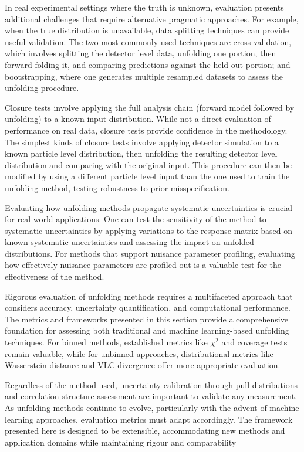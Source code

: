         In real experimental settings where the truth is unknown, evaluation presents additional challenges that require alternative pragmatic approaches.
        For example, when the true distribution is unavailable, data splitting techniques can provide useful validation.
        The two most commonly used techniques are cross validation, which involves splitting the detector level data, unfolding one portion, then forward folding it, and comparing predictions against the held out portion; and bootstrapping, where one generates multiple resampled datasets to assess the unfolding procedure.

        Closure tests involve applying the full analysis chain (forward model followed by unfolding) to a known input distribution.
        While not a direct evaluation of performance on real data, closure tests provide confidence in the methodology.
        The simplest kinds of closure tests involve applying detector simulation to a known particle level distribution, then unfolding the resulting detector level distribution and comparing with the original input.
        This procedure can then be modified by using a different particle level input than the one used to train the unfolding method, testing robustness to prior misspecification.
        
        Evaluating how unfolding methods propagate systematic uncertainties is crucial for real world applications.
        One can test the sensitivity of the method to systematic uncertainties by applying variations to the response matrix based on known systematic uncertainties and assessing the impact on unfolded distributions.
        For methods that support nuisance parameter profiling, evaluating how effectively nuisance parameters are profiled out is a valuable test for the effectiveness of the method.

        Rigorous evaluation of unfolding methods requires a multifaceted approach that considers accuracy, uncertainty quantification, and computational performance.
        The metrics and frameworks presented in this section provide a comprehensive foundation for assessing both traditional and machine learning-based unfolding techniques.
        For binned methods, established metrics like \(\chi^2\) and coverage tests remain valuable, while for unbinned approaches, distributional metrics like Wasserstein distance and VLC divergence offer more appropriate evaluation.
        
        Regardless of the method used, uncertainty calibration through pull distributions and correlation structure assessment are important to validate any measurement.
        As unfolding methods continue to evolve, particularly with the advent of machine learning approaches, evaluation metrics must adapt accordingly.
        The framework presented here is designed to be extensible, accommodating new methods and application domains while maintaining rigour and comparability